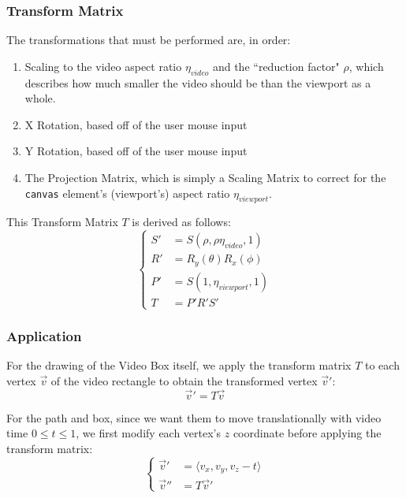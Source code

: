 \subsubsection{Transform Matrix}
The transformations that must be performed are, in order:
\begin{enumerate}
    \item Scaling to the video aspect ratio $\eta_{video}$ and the ``reduction factor" $\rho$, which describes how much smaller the video should be than the viewport as a whole.
    \item X Rotation, based off of the user mouse input
    \item Y Rotation, based off of the user mouse input
    \item The Projection Matrix, which is simply a Scaling Matrix to correct for the \texttt{canvas} element's (viewport's) aspect ratio $\eta_{viewport}$.
\end{enumerate}
This Transform Matrix $T$ is derived as follows:
\begin{equation}
\begin{cases}
    S' & = S(\rho, \rho \eta_{video}, 1) \\
    R' & = R_y(\theta) R_x(\phi) \\
    P' & = S(1, \eta_{viewport}, 1) \\
    T & = P' R' S'
\end{cases}
\end{equation}

\subsubsection{Application}
For the drawing of the Video Box itself, we apply the transform matrix $T$ to each vertex $\vec{v}$ of the video rectangle to obtain the transformed vertex $\vec{v}'$:
\begin{equation}
    \vec{v}' = T \vec{v}
\end{equation}
\par For the path and box, since we want them to move translationally with video time $0 \leq t \leq 1$, we first modify each vertex's $z$ coordinate before applying the transform matrix:
\begin{equation}
\begin{cases}
    \vec{v}' & = \langle v_x, v_y, v_z - t \rangle \\
    \vec{v}'' & = T \vec{v}'
\end{cases}
\end{equation}

